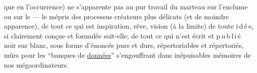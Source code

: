 que en l'occurrence) ne s'apparente pas au pur travail du marteau sur l'enclume ou sur le
 --- le mépris des processus créateurs  plus délicats
(et  de moindre apparence), 
de tout ce qui est  inspiration, rêve, vision
(à la limite) de toute i\,d\,é\,e, si clairement conçue et formulée soit-elle;
de tout ce qui n'est écrit et p\,u\,b\,l\,i\,é noir sur blanc,
sous forme d'énoncés purs et durs,
répertoriables et répertoriés, mûrs pour les ``banques de \uline{données}'' s'engouffrant
dans  inépuisables mémoires de nos mégaordinateurs.


